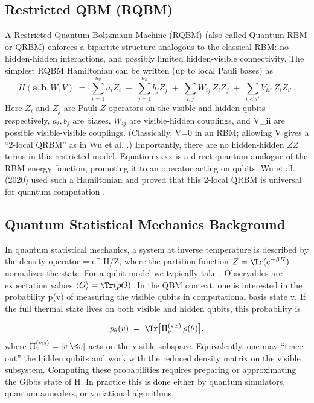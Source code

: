\documentclass[%
oneside,                 %
final,                   %
10pt]{article}
\begin{document}
\subsection{Restricted QBM (RQBM)}

A Restricted Quantum Boltzmann Machine (RQBM) (also called Quantum RBM
or QRBM) enforces a bipartite structure analogous to the classical
RBM: no hidden-hidden interactions, and possibly limited
hidden-visible connectivity.  The simplest RQBM Hamiltonian can be
written (up to local Pauli bases) as
\[
H(\mathbf{a},\mathbf{b},W,V) \;=\; \sum_{i=1}^{n_v} a_i Z_i \;+\; \sum_{j=1}^{n_h} b_j Z_j \;+\; \sum_{i,j} W_{ij}\, Z_i Z_j \;+\; \sum_{i<i{\prime}} V_{ii{\prime}}\, Z_i Z_{i{\prime}} \,.
\]
Here $Z_i$ and $Z_j$ are Pauli-$Z$ operators on the visible and hidden
qubits respectively, $a_i,b_j$ are biases, $W_{ij}$ are visible-hidden
couplings, and V_{ii{\prime}} are possible visible-visible couplings.
(Classically, V=0 in an RBM; allowing V gives a “2-local QRBM” as
in Wu et al. .)  Importantly, there are no hidden-hidden $ZZ$ terms in
this restricted model.  Equation xxxx  is a
direct quantum analogue of the RBM energy function, promoting it to an
operator acting on qubits.  Wu et al. (2020) used such a Hamiltonian
and proved that this 2-local QRBM is universal for quantum computation
.

\subsection{Quantum Statistical Mechanics Background}

In quantum statistical mechanics, a system at inverse temperature
\beta is described by the density operator \rho = e^{-\beta H}/Z,
where the partition function \(Z = \Tr(e^{-\beta H})\) normalizes the
state.  For a qubit model we typically take .  Observables are
expectation values \(\langle O\rangle = \Tr(\rho O)\). In the QBM
context, one is interested in the probability p(v) of measuring the
visible qubits in computational basis state v.  If the full thermal
state lives on both visible and hidden qubits, this probability is

\[
p_\theta(v) \;=\; \Tr\bigl[\Pi_v^{(\text{vis})}\,\rho(\theta)\bigr],
\]
where \(\Pi_v^{(\text{vis})}=|v\>\<v|\) acts on the visible subspace.
Equivalently, one may “trace out” the hidden qubits and work with the
reduced density matrix on the visible subsystem.  Computing these
probabilities requires preparing or approximating the Gibbs state of
H.  In practice this is done either by quantum simulators, quantum
annealers, or variational algorithms.
\end{document}
